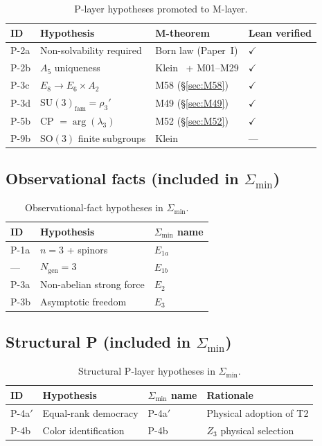 \documentclass[sn-mathphys-num,Numbered]{sn-jnl}
\theoremstyle{thmstyleone}
\theoremstyle{thmstylethree}
\newcommand{\Amin}{\Sigma_{\min}}
\newcommand{\Ngen}{N_{\mathrm{gen}}}
\newcommand{\SU}{\mathrm{SU}}
\newcommand{\SO}{\mathrm{SO}}
\begin{document}
\begin{appendices}
\begin{table}[htb]
\centering
\caption{P-layer hypotheses promoted to M-layer.}\label{tab:C1}
\begin{tabular}{llll}
\toprule
ID & Hypothesis & M-theorem & Lean verified \\
\midrule
P-2a & Non-solvability required & Born law (Paper~I) & $\checkmark$ \\
P-2b & $A_5$ uniqueness & Klein~\cite{Klein1884} + M01--M29 & $\checkmark$ \\
P-3c & $E_8 \to E_6 \times A_2$ & M58 (\S\ref{sec:M58}) & $\checkmark$ \\
P-3d & $\SU(3)_{\mathrm{fam}} = \rho_3'$ & M49 (\S\ref{sec:M49}) &
  $\checkmark$ \\
P-5b & CP $= \arg(\lambda_3)$ & M52 (\S\ref{sec:M52}) & $\checkmark$ \\
P-9b & $\SO(3)$ finite subgroups & Klein~\cite{Klein1884} & --- \\
\bottomrule
\end{tabular}
\end{table}


\subsection{Observational facts (included in $\Amin$)}

\begin{table}[htb]
\centering
\caption{Observational-fact hypotheses in $\Amin$.}\label{tab:C2}
\begin{tabular}{lll}
\toprule
ID & Hypothesis & $\Amin$ name \\
\midrule
P-1a & $n = 3$ + spinors & $E_{1a}$ \\
--- & $\Ngen = 3$ & $E_{1b}$ \\
P-3a & Non-abelian strong force & $E_2$ \\
P-3b & Asymptotic freedom & $E_3$ \\
\bottomrule
\end{tabular}
\end{table}


\subsection{Structural P (included in $\Amin$)}

\begin{table}[htb]
\centering
\caption{Structural P-layer hypotheses in $\Amin$.}\label{tab:C3}
\begin{tabular}{llll}
\toprule
ID & Hypothesis & $\Amin$ name & Rationale \\
\midrule
P-4a$'$ & Equal-rank democracy & P-4a$'$ & Physical adoption of T2 \\
P-4b & Color identification & P-4b & $Z_3$ physical selection \\
\bottomrule
\end{tabular}
\end{table}



\end{appendices}
\end{document}
